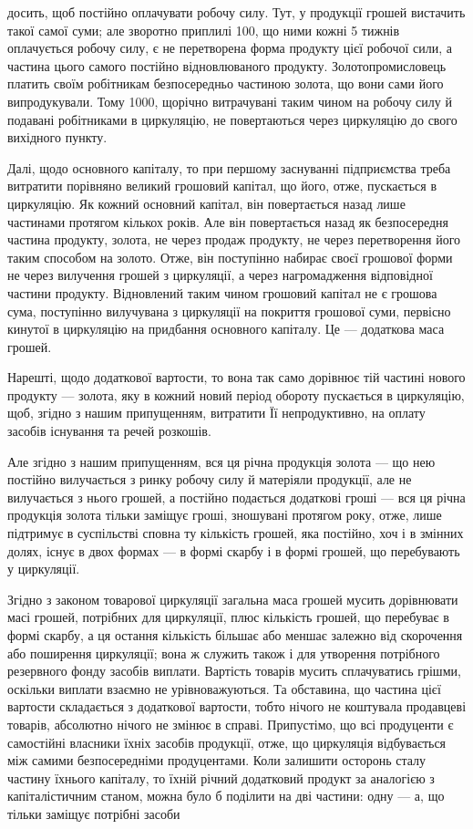 \parcont{}  %
досить, щоб постійно оплачувати робочу силу. Тут, у продукції грошей
вистачить такої самої суми; але зворотно приплилі 100, що ними
кожні 5 тижнів оплачується робочу силу, є не перетворена форма продукту
цієї робочої сили, а частина цього самого постійно відновлюваного
продукту. Золотопромисловець платить своїм робітникам безпосередньо
частиною золота, що вони сами його випродукували. Тому 1000,
щорічно витрачувані таким чином на робочу силу й подавані робітниками
в циркуляцію, не повертаються через циркуляцію до свого вихідного
пункту.

Далі, щодо основного капіталу, то при першому заснуванні підприємства
треба витратити порівняно великий грошовий капітал, що його,
отже, пускається в циркуляцію. Як кожний основний капітал, він повертається
назад лише частинами протягом кількох років. Але він повертається
назад як безпосередня частина продукту, золота, не через продаж
продукту, не через перетворення його таким способом на золото. Отже,
він поступінно набирає своєї грошової форми не через вилучення грошей
з циркуляції, а через нагромадження відповідної частини продукту.
Відновлений таким чином грошовий капітал не є грошова сума, поступінно
вилучувана з циркуляції на покриття грошової суми, первісно кинутої
в циркуляцію на придбання основного капіталу. Це — додаткова
маса грошей.

Нарешті, щодо додаткової вартости, то вона так само дорівнює тій
частині нового продукту — золота, яку в кожний новий період обороту
пускається в циркуляцію, щоб, згідно з нашим припущенням, витратити
Її непродуктивно, на оплату засобів існування та речей розкошів.

Але згідно з нашим припущенням, вся ця річна продукція золота —
що нею постійно вилучається з ринку робочу силу й матеріяли продукції,
але не вилучається з нього грошей, а постійно подається додаткові гроші
— вся ця річна продукція золота тільки заміщує гроші, зношувані протягом
року, отже, лише підтримує в суспільстві сповна ту кількість грошей,
яка постійно, хоч і в змінних долях, існує в двох формах — в формі
скарбу і в формі грошей, що перебувають у циркуляції.

Згідно з законом товарової циркуляції загальна маса грошей мусить
дорівнювати масі грошей, потрібних для циркуляції, плюс кількість грошей,
що перебуває в формі скарбу, а ця остання кількість більшає або
меншає залежно від скорочення або поширення циркуляції; вона ж служить
також і для утворення потрібного резервного фонду засобів виплати.
Вартість товарів мусить сплачуватись грішми, оскільки виплати
взаємно не урівноважуються. Та обставина, що частина цієї вартости
складається з додаткової вартости, тобто нічого не коштувала продавцеві
товарів, абсолютно нічого не змінює в справі. Припустімо, що всі
продуценти є самостійні власники їхніх засобів продукції, отже, що циркуляція
відбувається між самими безпосередніми продуцентами. Коли залишити
осторонь сталу частину їхнього капіталу, то їхній річний додатковий
продукт за аналогією з капіталістичним станом, можна було б поділити
на дві частини: одну — $а$, що тільки заміщує потрібні засоби
\parbreak{}  %
